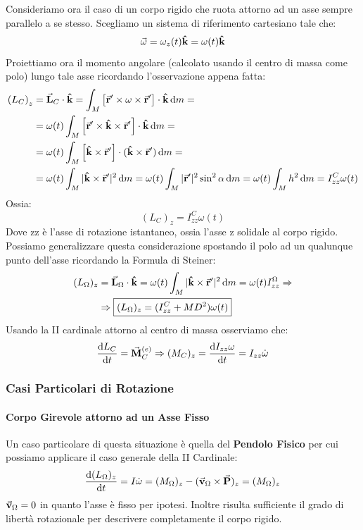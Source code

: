 \documentclass{article}
\newcommand{\note}{\noindent {\quad \bf \underline{Osservazione:}} \quad}
\newcommand{\then}{\ensuremath{\Rightarrow}}
\renewcommand{\k}{\vu{k}}
\renewcommand{\v}{\va{v}}
\renewcommand{\r}{\va{r}}
\newcommand{\M}{\va{M}}
\renewcommand{\P}{\va{P}}
\renewcommand{\L}{\va{L}}
\begin{document}
Consideriamo ora il caso di un corpo rigido che ruota attorno ad un asse sempre parallelo a se stesso. Scegliamo un sistema di riferimento cartesiano tale che:
\[\va{\omega}=\omega_z(t)\vu{k}=\omega(t)\k\]
Proiettiamo ora il momento angolare (calcolato usando il centro di massa come polo) lungo tale asse ricordando l'osservazione appena fatta:
\begin{equation}
\begin{split}
    \left(L_C\right)_z&=\L_C\cdot\k=\int_M\left[\r'\times\omega\times\r'\right]\cdot\k\dif m=\\
    &=\omega(t)\int_M\left[\r'\times\k\times\r'\right]\cdot\k\dif m=\\
    &=\omega(t)\int_M\left[\k\times\r'\right]\cdot(\k\times\r')\dif m=\\
    &=\omega(t)\int_M|\k\times\r'|^2\dif m=\omega(t)\int_M|\r'|^2\sin^2\alpha\dif m=\omega(t)\int_Mh^2\dif m=I_{zz}^C\omega(t)
\end{split}
\end{equation}
Ossia:
\[\boxed{(L_C)_z=I_{zz}^C\omega(t)}\]
Dove zz è l'asse di rotazione istantaneo, ossia l'asse z solidale al corpo rigido. Possiamo generalizzare questa considerazione spostando il polo ad un qualunque punto dell'asse ricordando la Formula di Steiner:
\begin{equation}
\begin{split}
    (L_\Omega)_z&=\L_\Omega\cdot\k=\omega(t)\int_M|\k\times\r'|^2\dif m=\omega(t)I_{zz}^\Omega\then\\
    &\then \boxed{(L_\Omega)_z=(I_{zz}^C+MD^2)\omega(t)}
\end{split}
\end{equation}
\note Usando la II cardinale attorno al centro di massa osserviamo che:
\[\dv{L_C}{t}=\M_C^{(e)}\then (M_C)_z=\dv{I_{zz}\omega}{t}=I_{zz}\dot{\omega}\]

\subsubsection{Casi Particolari di Rotazione}
\paragraph{Corpo Girevole attorno ad un Asse Fisso}
Un caso particolare di questa situazione è quella del \textbf{Pendolo Fisico} per cui possiamo applicare il caso generale della II Cardinale:
\[\dv{(L_\Omega)_z}{t}=I\dot{\omega}=(M_\Omega)_z-(\v_\Omega\times\P)_z=(M_\Omega)_z\]
\note $\v_\Omega=0$ in quanto l'asse è fisso per ipotesi. Inoltre risulta sufficiente il grado di libertà rotazionale per descrivere completamente il corpo rigido.
\end{document}
